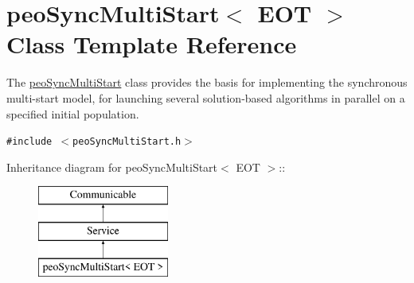 \hypertarget{classpeoSyncMultiStart}{
\section{peo\-Sync\-Multi\-Start$<$ EOT $>$ Class Template Reference}
\label{classpeoSyncMultiStart}
}
The \hyperlink{classpeoSyncMultiStart}{peo\-Sync\-Multi\-Start} class provides the basis for implementing the synchronous multi-start model, for launching several solution-based algorithms in parallel on a specified initial population.  


{\tt \#include $<$peo\-Sync\-Multi\-Start.h$>$}

Inheritance diagram for peo\-Sync\-Multi\-Start$<$ EOT $>$::\begin{figure}[H]
\begin{center}
\leavevmode
\includegraphics[height=3cm]{classpeoSyncMultiStart}
\end{center}
\end{figure}
